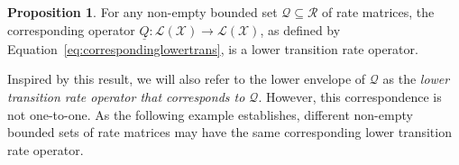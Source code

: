 \documentclass[10pt,a4paper]{paper}
\theoremstyle{definition}
\newtheorem{proposition}[theorem]{Proposition}
\newcommand{\states}{\mathcal{X}}
\newcommand{\gambles}{\mathcal{L}}
\newcommand{\gamblesX}{\gambles(\states)}
\newcommand{\rateset}{\mathcal{Q}}
\newcommand{\lrate}{\underline{Q}}
\begin{document}
\begin{proposition}\label{prop:lowerenvelopeislowertrans}
For any non-empty bounded set $\rateset\subseteq\mathcal{R}$ of rate matrices, the corresponding operator $\lrate\colon\gamblesX\to\gamblesX$, as defined by Equation~\eqref{eq:correspondinglowertrans}, is a lower transition rate operator.
\end{proposition}

\noindent
Inspired by this result, we will also refer to the lower envelope of $\rateset$ as the \emph{lower transition rate operator that corresponds to $\rateset$}. %
However, this correspondence is not one-to-one. As the following example establishes, different non-empty bounded sets of rate matrices may have the same corresponding lower transition rate operator.
\end{document}
